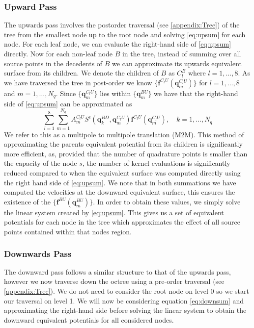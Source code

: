 \subsubsection{Upward Pass}
The upwards pass involves the postorder traversal (see \cref{appendix:Tree}) of the tree from the smallest node up to the root node and solving \cref{eq:upsum} for each node. For each leaf node, we can evaluate the right-hand side of \cref{eq:upsum} directly. Now for each non-leaf node $B$ in the tree, instead of summing over all source points in the decedents of $B$ we can approximate its upwards equivalent surface from its children. We denote the children of $B$ as $C_l^B$ where $l=1,...,8$. As we have traversed the tree in post-order we know $\{\bm{f}^{C_l U}(\bm{q}^{C_lU}_m)\}$ for $l=1,\dots,8$ and $m=1,\dots,N_q$. Since $\{\bm{q}^{C_lU}_m\}$ lies within $\{\bm{q}^{BU}_m\}$ we have that the right-hand side of \cref{eq:upsum} can be approximated as
\begin{equation}
\label{eq:M2M}
    \sum_{l=1}^{8} \sum_{m=1}^{N_{q}} A_{m}^{C_{l} U} S^\epsilon\left(\bm{q}_{k}^{B D}, \bm{q}_{m}^{C_{l} U}\right) \bm{f}^{C_{l} U}\left(\bm{q}_{m}^{C_{l} U}\right), \quad k=1,\dots,N_q
\end{equation}
We refer to this as a multipole to multipole translation (M2M). This method of approximating the parents equivalent potential from its children is significantly more efficient, as, provided that the number of quadrature points is smaller than the capacity of the node $s$, the number of kernel evaluations is significantly reduced compared to when the equivalent surface was computed directly using the right hand side of \cref{eq:upsum}. We note that in both summations we have computed the velocities at the downward equivalent surface, this ensures the existence of the $\{\bm{f}^{BU}(\bm{q}^{BU}_m)\}$. In order to obtain these values, we simply solve the linear system created by \cref{eq:upsum}. This gives us a set of equivalent potentials for each node in the tree which approximates the effect of all source points contained within that nodes region.

\subsubsection{Downwards Pass}
The downward pass follows a similar structure to that of the upwards pass, however we now traverse down the octree using a pre-order traversal (see \cref{appendix:Tree}). We do not need to consider the root node on level 0 so we start our traversal on level 1. We will now be considering equation \cref{eq:downsum} and approximating the right-hand side before solving the linear system to obtain the downward equivalent potentials for all considered nodes.


